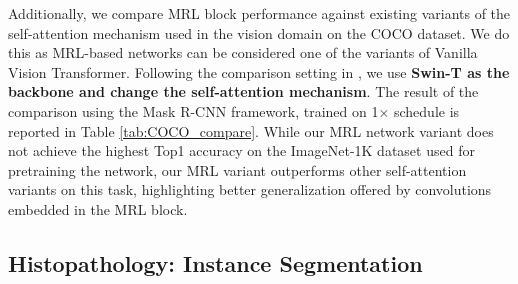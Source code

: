 \documentclass{article}
\begin{document}
\noindent Additionally, we compare MRL block performance against existing variants of the self-attention mechanism used in the vision domain on the COCO dataset. We do this as MRL-based networks can be considered one of the variants of Vanilla Vision Transformer. Following the comparison setting in \cite{DBLP:journals/corr/Swin}, we use \textbf{Swin-T as the backbone and change the self-attention mechanism}. The result of the comparison using the Mask R-CNN framework, trained on 1$\times$ schedule is reported in Table \ref{tab:COCO_compare}. While our MRL network variant does not achieve the highest Top1 accuracy on the ImageNet-1K dataset used for pretraining the network, our MRL variant outperforms other self-attention variants on this task, highlighting better generalization offered by convolutions embedded in the MRL block. 

\begin{table}[htbp]
  \centering
  \caption{Comparison between different self-attention mechanism on COCO dataset, using Mask R-CNN framework. Results taken from \cite{DBLP:journals/corr/CSwin}.}
  \label{tab:COCO_compare}\end{table}

\subsection{Histopathology: Instance Segmentation}\label{subsec:MBG}
\end{document}
